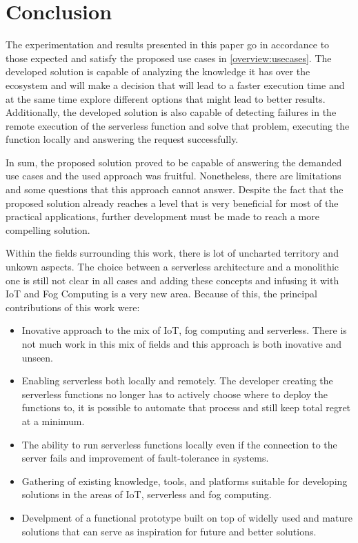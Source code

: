 \documentclass[conference]{IEEEtran}
\begin{document}
\section{Conclusion}
The experimentation and results presented in this paper go in accordance to
those expected and satisfy the proposed use cases in \ref{overview:usecases}. The
developed solution is capable of analyzing the knowledge it has over the ecosystem
and will make a decision that will lead to a faster execution time and at the
same time explore different options that might lead to better results.
Additionally, the developed solution is also capable of detecting failures in the
remote execution of the serverless function and solve that problem, executing the
function locally and answering the request successfully.

In sum, the proposed solution proved to be capable of answering the demanded use
cases and the used approach was fruitful. Nonetheless, there are limitations and
some questions that this approach cannot answer.
Despite the fact that the proposed solution already reaches a level that is very
beneficial for most of the practical applications, further development must be
made to reach a more compelling solution.

Within the fields surrounding this work, there is lot of uncharted
territory and unkown aspects. The choice between a serverless architecture and a
monolithic one is still not clear in all cases and adding these concepts and
infusing it with IoT and Fog Computing is a very new area. Because of this, the
principal contributions of this work were:

\begin{itemize}
    \item Inovative approach to the mix of IoT, fog computing and serverless. There
        is not much work in this mix of fields and this approach is both inovative
        and unseen.

    \item Enabling serverless both locally and remotely. The developer creating the
        serverless functions no longer has to actively choose where to deploy the
        functions to, it is possible to automate that process and still keep total
        regret at a minimum.

    \item The ability to run serverless functions locally even if the connection to
        the server fails and improvement of fault-tolerance in systems.

    \item Gathering of existing knowledge, tools, and platforms suitable for
        developing solutions in the areas of IoT, serverless and fog computing.

    \item Develpment of a functional prototype built on top of widelly used and
        mature solutions that can serve as inspiration for future and better
        solutions.
\end{itemize}
\end{document}
